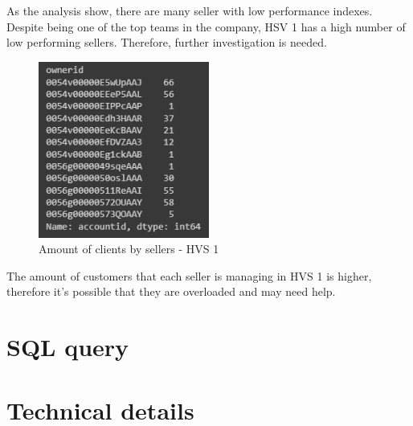 \documentclass[]{report}
\begin{document}
As the analysis show, there are many seller with low performance indexes. Despite being one of the top teams in the company, HSV 1 has a high number of low performing sellers. Therefore, further investigation is needed.

\begin{figure}[htb]
	\centering
	\includegraphics[width=0.50\textwidth]{fig_06_customers_and_sellers_hs1}
	\caption{Amount of clients by sellers - HVS 1}
	\label{fig:fig_07}
\end{figure}

The amount of customers that each seller is managing in HVS 1 is higher, therefore it's possible that they are overloaded and may need help.


\chapter{SQL query}

\chapter{Technical details}
\end{document}
